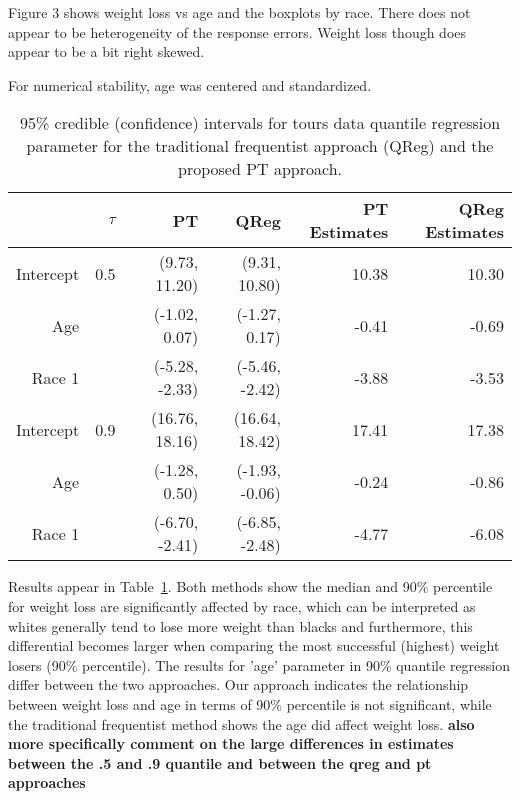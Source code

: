 \documentclass[12pt]{article}
\begin{document}
Figure 3 shows  weight loss vs age and the boxplots by race.
There does not appear to be 
heterogeneity of the response errors. Weight loss though does appear
to be a bit right
skewed. 

For numerical stability, 
age was centered and standardized.


\begin{table}[h]
  \caption[]{\label{tab:tours} 95\% credible (confidence) intervals for
    tours data quantile regression parameter for the 
    traditional frequentist approach (QReg) and the proposed PT approach.}
  \vspace{4mm}

  \centering
  \begin{tabular}{r|r|rrrr}
    \hline
    & $\tau$ & PT              & QReg             & PT Estimates
    & QReg Estimates                                        \\
    \hline
    Intercept & 0.5    & (9.73, 11.20)    & (9.31, 10.80)    & 10.38 & 10.30\\
    Age       &        & (-1.02, 0.07)  & (-1.27, 0.17)    & -0.41 & -0.69\\
    Race 1    &        & (-5.28, -2.33)  & (-5.46, -2.42)   & -3.88 & -3.53\\
    \hline
    Intercept & 0.9    & (16.76, 18.16)  & (16.64, 18.42)  & 17.41 & 17.38\\
    Age       &        & (-1.28, 0.50)   & (-1.93, -0.06)  & -0.24 & -0.86 \\
    Race 1    &        & (-6.70, -2.41) & (-6.85, -2.48) & -4.77 & -6.08\\
    \hline 
  \end{tabular}
\end{table}

Results appear in Table~\ref{tab:tours}.
Both methods  show the median  
and 90\% percentile for weight loss are significantly  affected by
race, which can be interpreted as whites generally tend to
lose more weight than blacks and furthermore, this differential 
becomes larger when comparing the most successful (highest) weight losers (90\%
percentile). The results for 'age'
parameter in 90\% quantile regression differ between the two
approaches.  Our approach
indicates the relationship between weight loss and age in terms of
90\% percentile is not significant, while the traditional frequentist
method shows the age did affect weight loss.
{\bf also more specifically comment on the large differences in
  estimates between the .5 and .9 quantile and between the qreg and pt
  approaches} 
\end{document}
